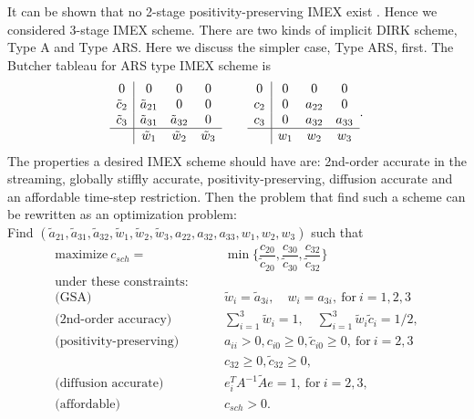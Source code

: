 It can be shown that no 2-stage positivity-preserving IMEX exist \cite{hu_etal_2018}.
Hence we considered 3-stage IMEX scheme.
There are two kinds of implicit DIRK scheme, Type A and Type ARS.
Here we discuss the simpler case, Type ARS, first.
The Butcher tableau for ARS type IMEX scheme is
\begin{equation}
  \begin{array}{c | c c c}
  	         0           & 0                    & 0                    & 0                    \\
  	\tilde{c}_{2} & \tilde{a}_{21}       & 0                    & 0                    \\
  	\tilde{c}_{3} & \tilde{a}_{31}       & \tilde{a}_{32}       & 0                    \\ \hline
  	                     & \tilde{w}_{1} & \tilde{w}_{2} & \tilde{w}_{3}
  \end{array}
  \qquad
  \begin{array}{c | c c c}
  	     0       & 0            & 0            & 0            \\
  	c_{2} & 0            & a_{22}       & 0            \\
  	c_{3} & 0            & a_{32}       & a_{33}       \\ \hline
  	             & w_{1} & w_{2} & w_{3}
  \end{array}.
\end{equation}
The properties a desired IMEX scheme should have are: 2nd-order accurate in the streaming, globally stiffly accurate, positivity-preserving, diffusion accurate and an affordable time-step restriction.
Then the problem that find such a scheme can be rewritten as an optimization problem:\\
Find $(\tilde{a}_{21}, \tilde{a}_{31}, \tilde{a}_{32}, \tilde{w}_{1}, \tilde{w}_{2}, \tilde{w}_{3}, a_{22}, a_{32}, a_{33}, w_{1}, w_{2}, w_{3})$ such that
\begin{align*}
\text{maximize} ~ c_{sch} = &\min \{ \dfrac{c_{20}}{\tilde{c}_{20}}, \dfrac{c_{30}}{\tilde{c}_{30}}, \dfrac{c_{32}}{\tilde{c}_{32}}\}\\
 \text{under these constraints:} \qquad & \\
 \text{(GSA)} \qquad\ &\tilde{w}_{i} = \tilde{a}_{3i}, \quad w_{i} = a_{3i}, ~\text{for} ~ i = 1,2,3\\
 \text{(2nd-order accuracy)} \qquad\ &\sum_{i=1}^{3}  \tilde{w}_{i} = 1, \quad \sum_{i=1}^{3}  \tilde{w}_{i}\tilde{c}_{i} = 1/2, \\
 \text{(positivity-preserving)} \qquad & a_{ii} > 0, c_{i0} \geq 0, \tilde{c}_{i0} \geq 0, ~\text{for} ~ i = 2,3 \\
 & c_{32} \geq 0, \tilde{c}_{32} \geq 0, \\
 \text{(diffusion accurate)} \qquad & e^{T}_iA^{-1}\tilde{A}e = 1, ~\text{for} ~ i = 2,3, \\
 \text{(affordable)} \qquad & c_{sch} > 0.
\end{align*}
